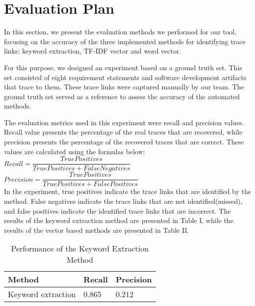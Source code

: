 \section{Evaluation Plan}
\label{sec:eval}


In this section, we present the evaluation methods we performed for our tool, focusing on the accuracy of the three implemented methods for identifying trace links: keyword extraction, TF-IDF vector and word vector.

For this purpose, we designed an experiment based on a ground truth set. This set consisted of eight requirement statements and software development artifacts that trace to them. These trace links were captured manually by our team. The ground truth set served as a reference to assess the accuracy of the automated methods.

The evaluation metrics used in this experiment were recall and precision values. Recall value presents the percentage of the real traces that are recovered, while precision presents the percentage of the recovered traces that are correct. These values are calculated using the formulas below:
\\

$Recall = \dfrac{True Positives}{True Positives + False Negatives}$
\\

$Precision = \dfrac{True Positives}{True Positives + False Positives}$
\\

In the experiment, true positives indicate the trace links that are identified by the method. False negatives indicate the trace links that are not identified(missed), and false positives indicate the identified trace links that are incorrect. The results of the keyword extraction method are presented in Table I, while the results of the vector based methods are presented in Table II.


\begin{table}[htb]
\centering
\caption{Performance of the Keyword Extraction Method}
\label{tab:keyperf}
\begin{tabular}{lll}
  \toprule
  Method & Recall & Precision\\
  \midrule

Keyword extraction & {0.865} & 0.212 \\
\bottomrule
\end{tabular}
\end{table}


